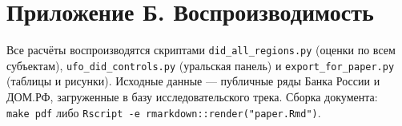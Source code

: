\documentclass[
  russian,
  11pt,
]{article}
\begin{document}
\section{Приложение Б.
Воспроизводимость}\label{ux43fux440ux438ux43bux43eux436ux435ux43dux438ux435-ux431.-ux432ux43eux441ux43fux440ux43eux438ux437ux432ux43eux434ux438ux43cux43eux441ux442ux44c}

Все расчёты воспроизводятся скриптами \texttt{did\_all\_regions.py}
(оценки по всем субъектам), \texttt{ufo\_did\_controls.py} (уральская
панель) и \texttt{export\_for\_paper.py} (таблицы и рисунки). Исходные
данные --- публичные ряды Банка России и ДОМ.РФ, загруженные в базу
исследовательского трека. Сборка документа: \texttt{make\ pdf} либо
\texttt{Rscript\ -e\ \textquotesingle{}rmarkdown::render("paper.Rmd")\textquotesingle{}}.

\appendix
\end{document}
